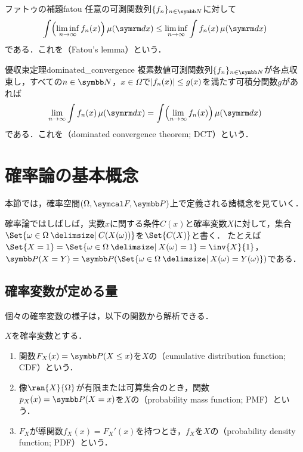 \documentclass[../../main]{subfiles}
\begin{document}
\begin{theorem}{ファトゥの補題}{fatou}
  任意の可測関数列\(\seq{f_n}_{n\in\numset{N}}\)に対して
  \[
    \int\pqty*{\liminf_{n\to\infty}f_n(x)}\measured[x]{\mu} \leq \liminf_{n\to\infty}\int f_n(x)\measured[x]{\mu}
  \]
  である．これを（Fatou's lemma）という．
\end{theorem}

\begin{theorem}{優収束定理}{dominated_convergence}
  複素数値可測関数列\(\seq{f_n}_{n\in\numset{N}}\)が各点収束し，すべての\(n\in\numset{N}\)，\(x\in\Omega\)で\(\lvert f_n(x)\rvert\leq g(x)\)を満たす可積分関数\(g\)があれば
  \[
    \lim_{n\to\infty}\int f_n(x)\measured[x]{\mu} = \int\pqty*{\lim_{n\to\infty}f_n(x)}\measured[x]{\mu}
  \]
  である．これを（dominated convergence theorem; DCT）という．
\end{theorem}

\section{確率論の基本概念}

本節では，確率空間\((\Omega,\sigmaalg{F},\prob)\)上で定義される諸概念を見ていく．

確率論ではしばしば，実数\(x\)に関する条件\(C(x)\)と確率変数\(X\)に対して，集合\(\Set{\omega\in\Omega\given C(X(\omega))}\)を\(\Set{C(X)}\)と書く．
たとえば\(\Set{X=1}=\Set{\omega\in\Omega\given X(\omega)=1}=\inv{X}{1}\)，\(\prob(X=Y)=\prob(\Set{\omega\in\Omega\given X(\omega)=Y(\omega)})\)である．

\subsection{確率変数が定める量}

個々の確率変数の様子は，以下の関数から解析できる．

\begin{definition}{}{}
  \(X\)を確率変数とする．
  \begin{enumerate}
    \item 関数\(F_X(x)=\prob(X\leq x)\)を\(X\)の（cumulative distribution function; CDF）という．
    \item 像\(\ran{X}{\Omega}\)が有限または可算集合のとき，関数\(p_X(x)=\prob(X=x)\)を\(X\)の（probability mass function; PMF）という．
    \item \(F_X\)が導関数\(f_X(x)=F_X'(x)\)を持つとき，\(f_X\)を\(X\)の（probability density function; PDF）という\footnotemark．
  \end{enumerate}
\end{definition}
\end{document}
